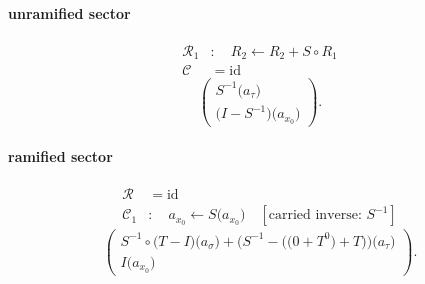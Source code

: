 \paragraph{unramified sector}
\[\begin{aligned}\mathcal R_{1}&:\quad R_2\leftarrow R_2+S\circ R_1\\\mathcal C&=\mathrm{id}\end{aligned}\]
\[\begin{pmatrix}S^{-1}\bigl(a_{\tau}\bigr)\\\bigl(I-S^{-1}\bigr)\bigl(a_{x_{0}}\bigr)\end{pmatrix}.\]
\paragraph{ramified sector}
\[\begin{aligned}\mathcal R&=\mathrm{id}\\\mathcal C_{1}&:\quad a_{x_{0}}\leftarrow S\bigl(a_{x_{0}}\bigr)\quad[\text{carried inverse: }S^{-1}]\end{aligned}\]
\[\begin{pmatrix}S^{-1}\circ \bigl(T-I\bigr)\bigl(a_{\sigma}\bigr)+\bigl(S^{-1}-\bigl(\bigl(0+T^{0}\bigr)+T\bigr)\bigr)\bigl(a_{\tau}\bigr)\\I\bigl(a_{x_{0}}\bigr)\end{pmatrix}.\]
